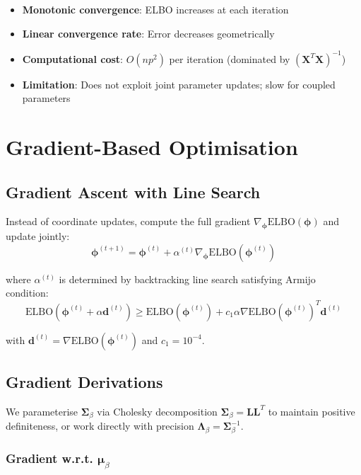 \documentclass[11pt]{article}
\newcommand{\ELBO}{\text{ELBO}}
\begin{document}
\begin{itemize}
\item \textbf{Monotonic convergence}: ELBO increases at each iteration
\item \textbf{Linear convergence rate}: Error decreases geometrically
\item \textbf{Computational cost}: $O(np^2)$ per iteration (dominated by $({\bm{X}^T\bm{X}})^{-1}$)
\item \textbf{Limitation}: Does not exploit joint parameter updates; slow for coupled parameters
\end{itemize}

\section{Gradient-Based Optimisation}

\subsection{Gradient Ascent with Line Search}

Instead of coordinate updates, compute the full gradient $\nabla_{\bm{\phi}} \ELBO(\bm{\phi})$ and update jointly:
\begin{equation}
\bm{\phi}^{(t+1)} = \bm{\phi}^{(t)} + \alpha^{(t)} \nabla_{\bm{\phi}} \ELBO(\bm{\phi}^{(t)})
\end{equation}

where $\alpha^{(t)}$ is determined by backtracking line search satisfying Armijo condition:
\begin{equation}
\ELBO(\bm{\phi}^{(t)} + \alpha \bm{d}^{(t)}) \geq \ELBO(\bm{\phi}^{(t)}) + c_1 \alpha \nabla \ELBO(\bm{\phi}^{(t)})^T \bm{d}^{(t)}
\end{equation}

with $\bm{d}^{(t)} = \nabla \ELBO(\bm{\phi}^{(t)})$ and $c_1 = 10^{-4}$.

\subsection{Gradient Derivations}

We parameterise $\bm{\Sigma}_\beta$ via Cholesky decomposition $\bm{\Sigma}_\beta = \bm{L}\bm{L}^T$ to maintain positive definiteness, or work directly with precision $\bm{\Lambda}_\beta = \bm{\Sigma}_\beta^{-1}$.

\subsubsection{Gradient w.r.t. \texorpdfstring{$\bm{\mu}_\beta$}{mu_beta}}
\end{document}
